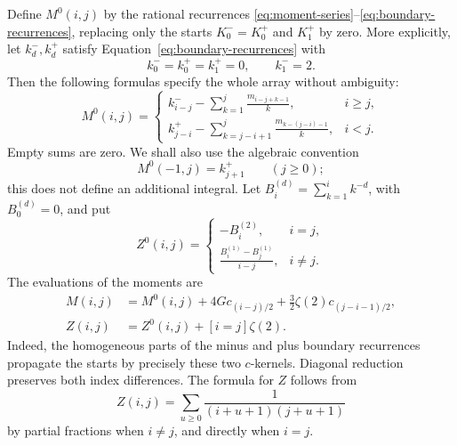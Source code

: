 Define $M^0(i,j)$ by the rational recurrences
\eqref{eq:moment-series}--\eqref{eq:boundary-recurrences}, replacing
only the starts $K^-_0=K^+_0$ and $K^+_1$ by zero.
More explicitly, let $k^-_d,k^+_d$ satisfy
Equation~\eqref{eq:boundary-recurrences} with
\begin{equation}\label{eq:rational-starts}
k^-_0=k^+_0=k^+_1=0,\qquad k^-_1=2.
\end{equation}
Then the following formulas specify the whole array without ambiguity:
\begin{equation}\label{eq:diagonal-reduction}
M^0(i,j)=
\begin{cases}
\displaystyle k^-_{i-j}-\sum_{k=1}^{j}\frac{m_{i-j+k-1}}{k},&i\ge j,\\[6pt]
\displaystyle k^+_{j-i}-\sum_{k=j-i+1}^{j}
                  \frac{m_{k-(j-i)-1}}{k},&i<j.
\end{cases}
\end{equation}
Empty sums are zero. We shall also use the algebraic convention
\begin{equation}\label{eq:negative-boundary}
M^0(-1,j)=k^+_{j+1}\qquad(j\ge0);
\end{equation}
this does not define an additional integral.
Let $B_i^{(d)}=\sum_{k=1}^i k^{-d}$, with $B_0^{(d)}=0$, and put
\begin{equation}\label{eq:rational-z}
Z^0(i,j)=\begin{cases}
-B_i^{(2)},&i=j,\\[2pt]
\displaystyle\frac{B_i^{(1)}-B_j^{(1)}}{i-j},&i\ne j.
\end{cases}
\end{equation}
The evaluations of the moments are
\begin{equation}\label{eq:rational-decomposition}
\begin{split}
M(i,j)&=M^0(i,j)+4G c_{(i-j)/2}
                      +\frac32\zeta(2)c_{(j-i-1)/2},\\
Z(i,j)&=Z^0(i,j)+[i=j]\zeta(2).
\end{split}
\end{equation}
Indeed, the homogeneous parts of the minus and plus boundary recurrences
propagate the starts by precisely these two $c$-kernels. Diagonal reduction
preserves both index differences. The formula for $Z$ follows from
\[
Z(i,j)=\sum_{u\ge0}\frac{1}{(i+u+1)(j+u+1)}
\]
by partial fractions when $i\ne j$, and directly when $i=j$.

